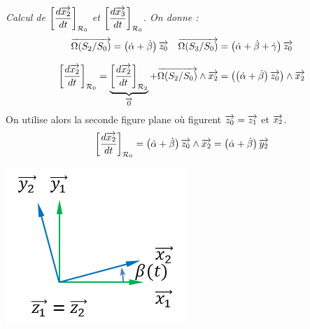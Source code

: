 \documentclass[11pt,oneside]{article}
\begin{document}
\begin{exemple}
\textit{Calcul de $\left[\dfrac{d\overrightarrow{x_2}}{dt}\right]_{\mathcal{R}_0}$ et $\left[\dfrac{d\overrightarrow{x_3}}{dt}\right]_{\mathcal{R}_0}$. On donne :}
$$\overrightarrow{\Omega(S_2/S_0)} = 
\left( \dot{\alpha} + \dot{\beta} \right)\overrightarrow{z_0}
\quad
\overrightarrow{\Omega(S_3/S_0)} = 
\left( \dot{\alpha} + \dot{\beta} + \dot{\gamma} \right)\overrightarrow{z_0}
$$

\begin{minipage}[c]{.65\linewidth}
$$
\left[\dfrac{d\overrightarrow{x_2}}{dt}\right]_{\mathcal{R}_0} 
= \underbrace{\left[\dfrac{d\overrightarrow{x_2}}{dt}\right]_{\mathcal{R}_2}}_{\overrightarrow{0}}
+ \overrightarrow{\Omega(S_2/S_0)} \wedge \overrightarrow{x_2}
=  \left( \left( \dot{\alpha} + \dot{\beta} \right)\overrightarrow{z_0} \right)\wedge \overrightarrow{x_2}
$$
On utilise alors la seconde figure plane où figurent $\overrightarrow{z_0}=\overrightarrow{z_1}$ et $\overrightarrow{x_2}$. 
$$
\left[\dfrac{d\overrightarrow{x_2}}{dt}\right]_{\mathcal{R}_0} 
=  \left(  \dot{\alpha} + \dot{\beta} \right)\overrightarrow{z_0}\wedge \overrightarrow{x_2}
=  \left(  \dot{\alpha} + \dot{\beta} \right)\overrightarrow{y_2}
$$
\end{minipage}\hfill
\begin{minipage}[c]{.3\linewidth}
\includegraphics[width=.9\textwidth]{png/beta}
\end{minipage}

\vspace{0.5cm}


\end{exemple}
\end{document}
